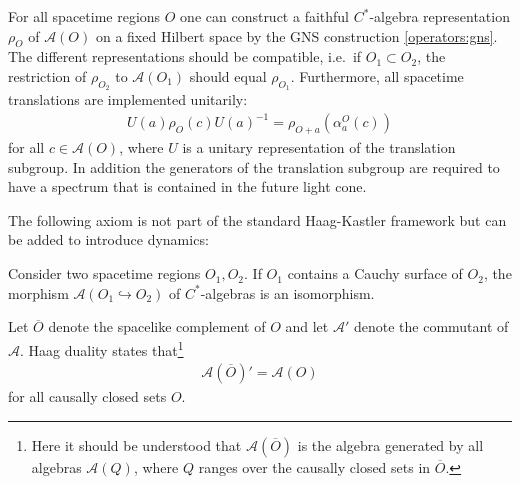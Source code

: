     \begin{axiom}[Spectrum]
        For all spacetime regions $O$ one can construct a faithful $C^*$-algebra representation $\rho_O$ of $\mathcal{A}(O)$ on a fixed Hilbert space by the GNS construction \ref{operators:gns}. The different representations should be compatible, i.e.~if $O_1\subset O_2$, the restriction of $\rho_{O_2}$ to $\mathcal{A}(O_1)$ should equal $\rho_{O_1}$. Furthermore, all spacetime translations are implemented unitarily:
        \begin{gather}
            U(a)\rho_O(c)U(a)^{-1} = \rho_{O+a}(\alpha^O_a(c))
        \end{gather}
        for all $c\in\mathcal{A}(O)$, where $U$ is a unitary representation of the translation subgroup. In addition the generators of the translation subgroup are required to have a spectrum that is contained in the future light cone.
    \end{axiom}

    The following axiom is not part of the standard Haag-Kastler framework but can be added to introduce dynamics:
    \begin{axiom}
        Consider two spacetime regions $O_1,O_2$. If $O_1$ contains a Cauchy surface of $O_2$, the morphism $\mathcal{A}(O_1\hookrightarrow O_2)$ of $C^*$-algebras is an isomorphism.
    \end{axiom}

    \begin{axiom}
        Let $\overline{O}$ denote the spacelike complement of $O$ and let $\mathcal{A}'$ denote the commutant of $\mathcal{A}$. Haag duality states that\footnote{Here it should be understood that $\mathcal{A}\left(\overline{O}\right)$ is the algebra generated by all algebras $\mathcal{A}(Q)$, where $Q$ ranges over the causally closed sets in $\overline{O}$.}
        \begin{gather}
            \mathcal{A}\left(\overline{O}\right)' = \mathcal{A}(O)
        \end{gather}
        for all causally closed sets $O$.
    \end{axiom}

